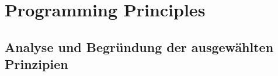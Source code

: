 \chapter{Programming Principles}
\label{chapter:programming_principles}

\section{Analyse und Begründung der ausgewählten Prinzipien}

